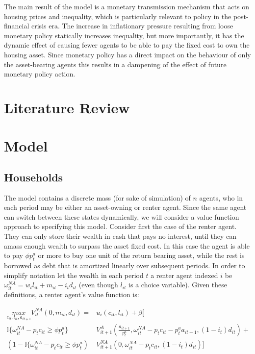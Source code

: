 \documentclass{article}
\begin{document}
The main result of the model is a monetary transmission mechanism that acts on housing prices and inequality, which is particularly relevant to policy in the post-financial crisis era. The increase in inflationary pressure resulting from loose monetary policy statically increases inequality, but more importantly, it has the dynamic effect of causing fewer agents to be able to pay the fixed cost to own the housing asset. Since monetary policy has a direct impact on the behaviour of only the asset-bearing agents this results in a dampening of the effect of future monetary policy action.

\section{Literature Review} \label{lit_review}

\section{Model} \label{model}

\subsection{Households} \label{households}

The model contains a discrete mass (for sake of simulation) of $n$ agents, who in each period may be either an asset-owning or renter agent. Since the same agent can switch between these states dynamically, we will consider a value function approach to specifying this model. Consider first the case of the renter agent. They can only store their wealth in cash that pays no interest, until they can amass enough wealth to surpass the asset fixed cost. In this case the agent is able to pay $\phi p^a_t$ or more to buy one unit of the return bearing asset, while the rest is borrowed as debt that is amortized linearly over subsequent periods. In order to simplify notation let the wealth in each period $t$ a renter agent indexed $i$ be $\omega^{NA}_{it} = w_t l_{it} + m_{it} - i_t d_{it}$ (even though $l_{it}$ is a choice variable). Given these definitions, a renter agent's value function is:

\begin{align}
  \underset{c_{it}, l_{it}, a_{it+1}}{max} V^{NA}_{it}(0, m_{it}, d_{it}) = &u_{i}(c_{it}, l_{it}) + \beta [ \nonumber \\ 
  \mathbb{I}\{\omega^{NA}_{it} - p_t c_{it} \geq \phi p_t^a \} &V^A_{it+1}(\frac{a_{it+1}}{p^a_t}, \omega^{NA}_{it} - p_t c_{it} - p^a_t a_{it+1}, (1 - i_t) d_{it}) + \nonumber \\ 
  \left(1 - \mathbb{I}\{\omega^{NA}_{it} - p_t c_{it} \geq \phi p_t^a \right) &V^{NA}_{it+1}(0, \omega^{NA}_{it} - p_t c_{it}, (1 - i_t) d_{it})] \label{vna}
\end{align}
\end{document}
